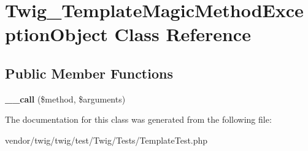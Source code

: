 \hypertarget{classTwig__TemplateMagicMethodExceptionObject}{}\section{Twig\+\_\+\+Template\+Magic\+Method\+Exception\+Object Class Reference}
\label{classTwig__TemplateMagicMethodExceptionObject}
\subsection*{Public Member Functions}
\begin{DoxyCompactItemize}
\item 
{\bfseries \+\_\+\+\_\+call} (\$method, \$arguments)\hypertarget{classTwig__TemplateMagicMethodExceptionObject_a829b93fc2871480fa2d3f718b8710c49}{}\label{classTwig__TemplateMagicMethodExceptionObject_a829b93fc2871480fa2d3f718b8710c49}

\end{DoxyCompactItemize}


The documentation for this class was generated from the following file\+:\begin{DoxyCompactItemize}
\item 
vendor/twig/twig/test/\+Twig/\+Tests/Template\+Test.\+php\end{DoxyCompactItemize}
